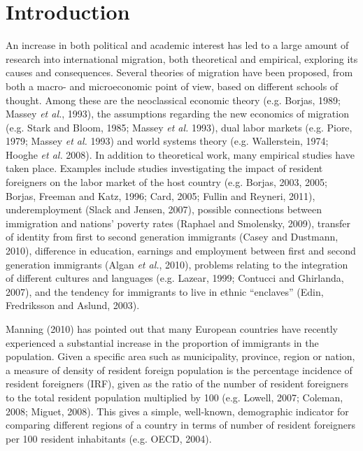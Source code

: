\documentclass[12pt]{article}
\theoremstyle{definition}
\theoremstyle{plain}
\begin{document}
\section{Introduction \label{IN}}

An increase in both political and academic interest has led to a large amount of research into international migration, both theoretical and empirical, exploring its causes and consequences. Several theories of migration have been proposed, from both a macro- and microeconomic point of view, based on different schools of thought. Among these are the neoclassical economic theory (e.g. Borjas, 1989; Massey \textit{et al.}, 1993), the assumptions regarding the new economics of migration (e.g. Stark and Bloom, 1985; Massey \textit{et al.} 1993), dual labor markets (e.g. Piore, 1979; Massey \textit{et al.} 1993) and world systems theory (e.g. Wallerstein, 1974; Hooghe \textit{et al.} 2008). In addition to theoretical work, many empirical studies have taken place. Examples include studies investigating the impact of resident foreigners on the labor market of the host country (e.g. Borjas, 2003, 2005; Borjas, Freeman and Katz, 1996; Card, 2005; Fullin and Reyneri, 2011), underemployment (Slack and Jensen, 2007), possible connections between immigration and nations' poverty rates (Raphael and Smolensky, 2009), transfer of identity from first to second generation immigrants (Casey and Dustmann, 2010), difference in education, earnings and employment between first and second generation immigrants (Algan \textit{et al.}, 2010), problems relating to the integration of different cultures and languages (e.g. Lazear, 1999; Contucci and Ghirlanda, 2007), and the tendency for immigrants to live in ethnic ``enclaves'' (Edin, Fredriksson and Aslund, 2003). 
  
Manning (2010) has pointed out that many European countries have recently experienced a substantial increase in the proportion of immigrants in the population. Given a specific area such as municipality, province, region or nation, a measure of density of resident foreign population is the percentage incidence of resident foreigners (IRF), given as the ratio of the number of resident foreigners to the total resident population multiplied by 100 (e.g. Lowell, 2007; Coleman, 2008; Miguet, 2008). This gives a simple, well-known, demographic indicator for comparing different regions of a country in terms of number of resident foreigners per 100 resident inhabitants (e.g. OECD, 2004). 
\end{document}
